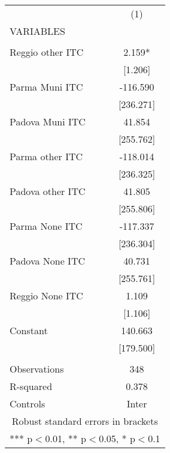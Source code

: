\begin{tabular}{lc} \hline
 & (1) \\
VARIABLES &  \\ \hline
 &  \\
Reggio other ITC & 2.159* \\
 & [1.206] \\
Parma Muni ITC & -116.590 \\
 & [236.271] \\
Padova Muni ITC & 41.854 \\
 & [255.762] \\
Parma other ITC & -118.014 \\
 & [236.325] \\
Padova other ITC & 41.805 \\
 & [255.806] \\
Parma None ITC & -117.337 \\
 & [236.304] \\
Padova None ITC & 40.731 \\
 & [255.761] \\
Reggio None ITC & 1.109 \\
 & [1.106] \\
Constant & 140.663 \\
 & [179.500] \\
 &  \\
Observations & 348 \\
R-squared & 0.378 \\
 Controls & Inter \\ \hline
\multicolumn{2}{c}{ Robust standard errors in brackets} \\
\multicolumn{2}{c}{ *** p$<$0.01, ** p$<$0.05, * p$<$0.1} \\
\end{tabular}
